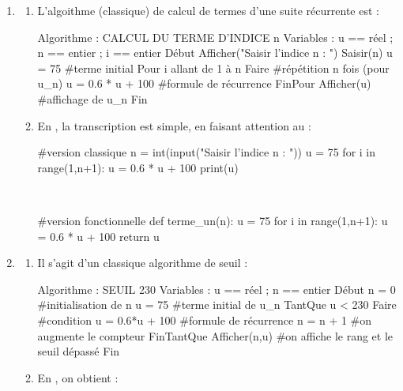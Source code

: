 \documentclass[a4paper,11pt]{article}
\begin{document}
\begin{cmanip}
\vspace{-0.45cm}
\begin{enumerate}
	\item 
	\begin{enumerate}
		\item L'algoithme (classique) de calcul de termes d'une suite récurrente est : \vspace{-0.05cm}
\begin{tcpseudocode}[15cm]
Algorithme : CALCUL DU TERME D'INDICE n
Variables : u == réel ; n == entier ; i == entier
Début
	Afficher("Saisir l'indice n : ")
	Saisir(n)
	u = 75                              #terme initial
	Pour i allant de 1 à n Faire        #répétition n fois (pour u_n)
		u = 0.6 * u + 100               #formule de récurrence
	FinPour
	Afficher(u)                         #affichage de u_n
Fin
\end{tcpseudocode}
		\item En \calgpython{}, la transcription est simple, en faisant attention au  : 
		
		\begin{center}
			\begin{minipage}{0.45\linewidth}
				\begin{envpython}[7.5cm]
					#version classique
					n = int(input("Saisir l'indice n : "))
					u = 75
					for i in range(1,n+1):
						u = 0.6 * u + 100
					print(u)
				\end{envpython}
			\end{minipage}
			\hfill~
			\begin{minipage}{0.45\linewidth}
				\begin{envpython}[7.5cm]
					#version fonctionnelle
					def terme_un(n):
						u = 75
						for i in range(1,n+1):
							u = 0.6 * u + 100
						return u
				\end{envpython}
			\end{minipage}
		\end{center}
	\end{enumerate}
	\item
	\begin{enumerate}
		\item Il s'agit d'un classique algorithme de seuil : \vspace{-0.25cm}
\begin{tcpseudocode}[15cm]
Algorithme : SEUIL 230
Variables : u == réel ; n == entier
Début
	n = 0                           #initialisation de n
	u = 75                          #terme initial de u_n
	TantQue u < 230 Faire           #condition
		u = 0.6*u + 100             #formule de récurrence
		n = n + 1                   #on augmente le compteur
	FinTantQue
	Afficher(n,u)                   #on affiche le rang et le seuil dépassé
Fin
\end{tcpseudocode}	
	\item En \calgpython{}, on obtient :
	

\end{enumerate}
\end{enumerate}
\end{cmanip}
\end{document}
